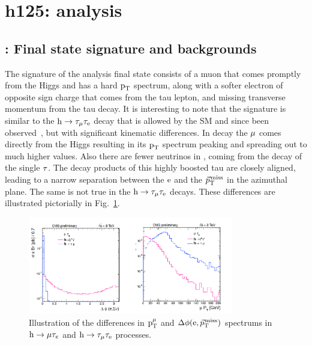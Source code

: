 \section{h125: \hmue analysis}
\label{h125_evt_sel}
\subsection{\hmue: Final state signature and backgrounds}
\label{h125_signature}
The signature of the \hmue analysis final state consists of a muon that comes promptly from the Higgs and has a hard $\text{p}_\text{T}$ spectrum, along with a softer electron of opposite sign charge that comes from the tau lepton, and missing transverse momentum from the tau decay. It is interesting to note that the signature is similar to the $\text{h} \to \tau_{\mu}\tau_{\text{e}}$ decay that is allowed by the SM and since been observed~\cite{CMS-PAS-HIG-16-043}, but with significant kinematic differences. In \hmue decay the $\mu$ comes directly from the Higgs resulting in its $\text{p}_\text{T}$ spectrum peaking and spreading out to much higher values. Also there are fewer neutrinos in \hmue, coming from the decay of the single $\tau$. The decay products of this highly boosted tau are closely aligned, leading to a narrow separation between the $\text{e}$ and the ${\vec p}_{\mathrm{T}}^{\kern1pt\text{miss}}$ in the azimuthal plane. The same is not true in the $\text{h} \to \tau_{\mu}\tau_{\text{e}}$ decays. These differences are illustrated pictorially in Fig.~\ref{fig:htt_v_lfv}.


\begin{figure}
\begin{center}
\includegraphics[width=0.8\textwidth,keepaspectratio]{plots_and_figures/chapter5/htt_v_lfv.pdf}
\caption{Illustration of the differences in $\text{p}_\text{T}^{\mu}$ and $\Delta\phi(\text{e}, {\vec p}_{\mathrm{T}}^{\kern1pt\text{miss}})$ spectrums in $\text{h} \to \mu \tau_{e}$ and $\text{h} \to \tau_{\mu}\tau_{\text{e}}$ processes.}
\label{fig:htt_v_lfv}
\end{center}
\end{figure}

